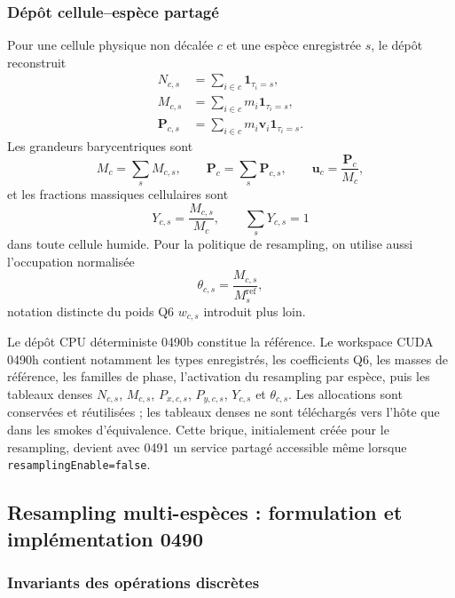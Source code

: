 \documentclass[11pt,a4paper]{article}
\begin{document}
\subsubsection{Dépôt cellule--espèce partagé}

Pour une cellule physique non décalée $c$ et une espèce enregistrée $s$, le dépôt reconstruit
\begin{align}
  N_{c,s} &= \sum_{i\in c}\mathbf{1}_{\tau_i=s},\\
  M_{c,s} &= \sum_{i\in c}m_i\mathbf{1}_{\tau_i=s},\\
  \bm{P}_{c,s} &= \sum_{i\in c}m_i\bm{v}_i\mathbf{1}_{\tau_i=s}.
\end{align}
Les grandeurs barycentriques sont
\begin{equation}
  M_c=\sum_sM_{c,s},\qquad
  \bm{P}_c=\sum_s\bm{P}_{c,s},\qquad
  \bm{u}_c=\frac{\bm{P}_c}{M_c},
\end{equation}
et les fractions massiques cellulaires sont
\begin{equation}
  Y_{c,s}=\frac{M_{c,s}}{M_c},
  \qquad \sum_sY_{c,s}=1
\end{equation}
dans toute cellule humide. Pour la politique de resampling, on utilise aussi l'occupation normalisée
\begin{equation}
  \theta_{c,s}=\frac{M_{c,s}}{M_s^{\mathrm{ref}}},
\end{equation}
notation distincte du poids Q6 $w_{c,s}$ introduit plus loin.

Le dépôt CPU déterministe 0490b constitue la référence. Le workspace CUDA 0490h contient notamment les types enregistrés, les coefficients Q6, les masses de référence, les familles de phase, l'activation du resampling par espèce, puis les tableaux denses $N_{c,s}$, $M_{c,s}$, $P_{x,c,s}$, $P_{y,c,s}$, $Y_{c,s}$ et $\theta_{c,s}$. Les allocations sont conservées et réutilisées ; les tableaux denses ne sont téléchargés vers l'hôte que dans les smokes d'équivalence. Cette brique, initialement créée pour le resampling, devient avec 0491 un service partagé accessible même lorsque \texttt{resamplingEnable=false}.

\subsection{Resampling multi-espèces : formulation et implémentation 0490}

\subsubsection{Invariants des opérations discrètes}
\end{document}
